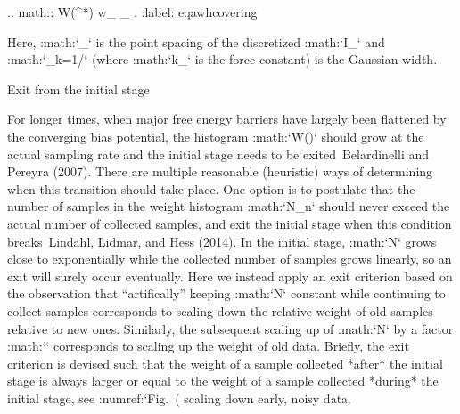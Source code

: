 .. math:: \Delta W(\lambda^*)
          \ge w_{}
          \equiv \prod_{\mu} .
          :label: eqawhcovering

Here, :math:`\Delta \lambda_{\mu}` is the point spacing of the discretized
:math:`I_{\mu}` and :math:`\sigma_k=1/` (where :math:`k_{\mu}`
is the force constant) is the Gaussian width.

Exit from the initial stage
^^^^^^^^^^^^^^^^^^^^^^^^^^^

For longer times, when major free energy barriers have largely been
flattened by the converging bias potential, the histogram
:math:`W(\lambda)` should grow at the actual sampling rate and the
initial stage needs to be exited Belardinelli and Pereyra (2007). There
are multiple reasonable (heuristic) ways of determining when this
transition should take place. One option is to postulate that the number
of samples in the weight histogram :math:`N_n` should never exceed the
actual number of collected samples, and exit the initial stage when this
condition breaks Lindahl, Lidmar, and Hess (2014). In the initial stage,
:math:`N` grows close to exponentially while the collected number of
samples grows linearly, so an exit will surely occur eventually. Here we
instead apply an exit criterion based on the observation that
“artifically” keeping :math:`N` constant while continuing to collect
samples corresponds to scaling down the relative weight of old samples
relative to new ones. Similarly, the subsequent scaling up of :math:`N`
by a factor :math:`\gamma` corresponds to scaling up the weight of old
data. Briefly, the exit criterion is devised such that the weight of a
sample collected *after* the initial stage is always larger or equal to
the weight of a sample collected *during* the initial stage, see
:numref:`Fig. (%
scaling down early, noisy data.

